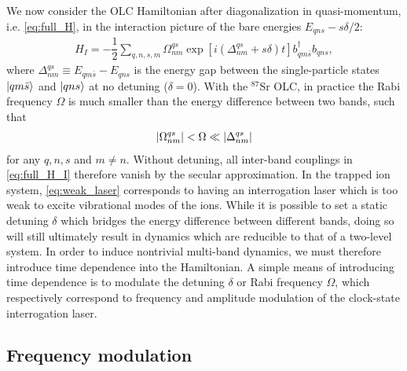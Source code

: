 \documentclass[aps,notitlepage,nofootinbib,11pt]{revtex4-1}
\newcommand{\f}[2]{\dfrac{#1}{#2}} %
\newcommand{\p}[1]{\left(#1\right)} %
\renewcommand{\sp}[1]{\left[#1\right]} %
\newcommand{\1}{\mathds{1}}
\begin{document}
We now consider the OLC Hamiltonian after diagonalization in
quasi-momentum, i.e. \eqref{eq:full_H}, in the interaction picture of
the bare energies $E_{qns}-s\delta/2$:
\begin{align}
  H_I
  = -\f12\sum_{q,n,s,m} \Omega^{qs}_{nm}
  \exp\sp{i\p{\Delta^{qs}_{nm}+s\delta}t}
  b_{qm\bar s}^\dag b_{qns},
  \label{eq:full_H_I}
\end{align}
where $\Delta^{qs}_{nm}\equiv E_{qm\bar s}-E_{qns}$ is the energy gap
between the single-particle states $\ket{qm\bar s}$ and $\ket{qns}$ at
no detuning ($\delta=0$). With the ${}^{87}$Sr OLC, in practice the
Rabi frequency $\Omega$ is much smaller than the energy difference
between two bands, such that
\begin{align}
  \abs{\Omega^{qs}_{nm}} < \Omega\ll\abs{\Delta^{qs}_{nm}}
  \label{eq:weak_laser}
\end{align}
for any $q,n,s$ and $m\ne n$. Without detuning, all inter-band
couplings in \eqref{eq:full_H_I} therefore vanish by the secular
approximation. In the trapped ion system, \eqref{eq:weak_laser}
corresponds to having an interrogation laser which is too weak to
excite vibrational modes of the ions. While it is possible to set a
static detuning $\delta$ which bridges the energy difference between
different bands, doing so will still ultimately result in dynamics
which are reducible to that of a two-level system. In order to induce
nontrivial multi-band dynamics, we must therefore introduce time
dependence into the Hamiltonian. A simple means of introducing time
dependence is to modulate the detuning $\delta$ or Rabi frequency
$\Omega$, which respectively correspond to frequency and amplitude
modulation of the clock-state interrogation laser.


\subsection{Frequency modulation}
\label{sec:freq_mod}
\end{document}
